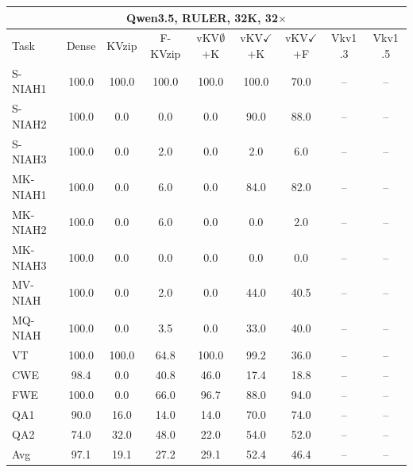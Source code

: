 \begin{tabular}{lcccccccc}
\toprule
\multicolumn{9}{c}{Qwen3.5, RULER, 32K, 32$\times$} \\
\midrule
Task & Dense & KVzip & F-KVzip & vKV$\emptyset$+K & vKV$\checkmark$+K & vKV$\checkmark$+F & Vkv1 .3 & Vkv1 .5 \\
\midrule
S-NIAH1 & 100.0 & 100.0 & 100.0 & 100.0 & 100.0 & 70.0 & -- & -- \\
S-NIAH2 & 100.0 & 0.0 & 0.0 & 0.0 & 90.0 & 88.0 & -- & -- \\
S-NIAH3 & 100.0 & 0.0 & 2.0 & 0.0 & 2.0 & 6.0 & -- & -- \\
MK-NIAH1 & 100.0 & 0.0 & 6.0 & 0.0 & 84.0 & 82.0 & -- & -- \\
MK-NIAH2 & 100.0 & 0.0 & 6.0 & 0.0 & 0.0 & 2.0 & -- & -- \\
MK-NIAH3 & 100.0 & 0.0 & 0.0 & 0.0 & 0.0 & 0.0 & -- & -- \\
MV-NIAH & 100.0 & 0.0 & 2.0 & 0.0 & 44.0 & 40.5 & -- & -- \\
MQ-NIAH & 100.0 & 0.0 & 3.5 & 0.0 & 33.0 & 40.0 & -- & -- \\
VT & 100.0 & 100.0 & 64.8 & 100.0 & 99.2 & 36.0 & -- & -- \\
CWE & 98.4 & 0.0 & 40.8 & 46.0 & 17.4 & 18.8 & -- & -- \\
FWE & 100.0 & 0.0 & 66.0 & 96.7 & 88.0 & 94.0 & -- & -- \\
QA1 & 90.0 & 16.0 & 14.0 & 14.0 & 70.0 & 74.0 & -- & -- \\
QA2 & 74.0 & 32.0 & 48.0 & 22.0 & 54.0 & 52.0 & -- & -- \\
\midrule
Avg & 97.1 & 19.1 & 27.2 & 29.1 & 52.4 & 46.4 & -- & -- \\
\bottomrule
\end{tabular}
\vspace{0.8em}

